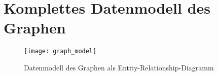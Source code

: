 \chapter{Komplettes Datenmodell des Graphen}
\label{complete_data_model}

\begin{figure}[h]
\centering
\texttt{[image: graph\_model]}
\caption{Datenmodell des Graphen als Entity-Relationship-Diagramm}
\label{fig:graph_model}
\end{figure}